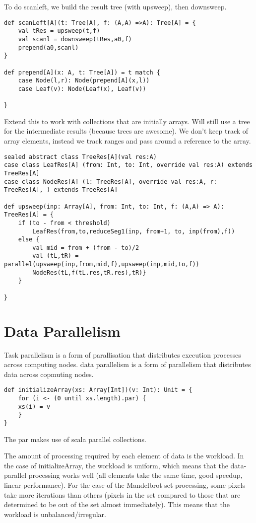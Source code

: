 To do scanleft, we build the result tree (with upsweep), then downsweep.
\begin{lstlisting}
def scanLeft[A](t: Tree[A], f: (A,A) =>A): Tree[A] = {
    val tRes = upsweep(t,f)
    val scanl = downsweep(tRes,a0,f)
    prepend(a0,scanl)
}

def prepend[A](x: A, t: Tree[A]) = t match {
    case Node(l,r): Node(prepend[A](x,l))
    case Leaf(v): Node(Leaf(x), Leaf(v))

}
\end{lstlisting}

Extend this to work with collections that are initially arrays. Will still use a tree for the intermediate results (because trees are awesome). We don't keep track of array elements, instead we track ranges and pass around a reference to the array.

\begin{lstlisting}
sealed abstract class TreeRes[A](val res:A)
case class LeafRes[A] (from: Int, to: Int, override val res:A) extends TreeRes[A]
case class NodeRes[A] (l: TreeRes[A], override val res:A, r: TreeRes[A], ) extends TreeRes[A]

def upsweep(inp: Array[A], from: Int, to: Int, f: (A,A) => A): TreeRes[A] = {
    if (to - from < threshold)
        LeafRes(from,to,reduceSeg1(inp, from+1, to, inp(from),f))
    else {
        val mid = from + (from - to)/2
        val (tL,tR) = parallel(upsweep(inp,from,mid,f),upsweep(inp,mid,to,f))
        NodeRes(tL,f(tL.res,tR.res),tR)}
    }

}
\end{lstlisting}
\chapter{Data Parallelism}
Task parallelism is a form of parallisation that distributes execution processes across computing nodes.
data parallelism is a form of parallelism that distributes data across copmuting nodes.

\begin{lstlisting}
def initializeArray(xs: Array[Int])(v: Int): Unit = {
    for (i <- (0 until xs.length).par) {
    xs(i) = v
    }
}
\end{lstlisting}

The par makes use of scala parallel collections.

The amount of processing required by each element of data is the workload. In the case of initializeArray, the workload is uniform, which means that the data-parallel processing works well (all elements take the same time, good speedup, linear performance).
For the case of the Mandelbrot set processing, some pixels take more iterations than others (pixels in the set compared to those that are determined to be out of the set almost immediately). This means that the workload is unbalanced/irregular.

